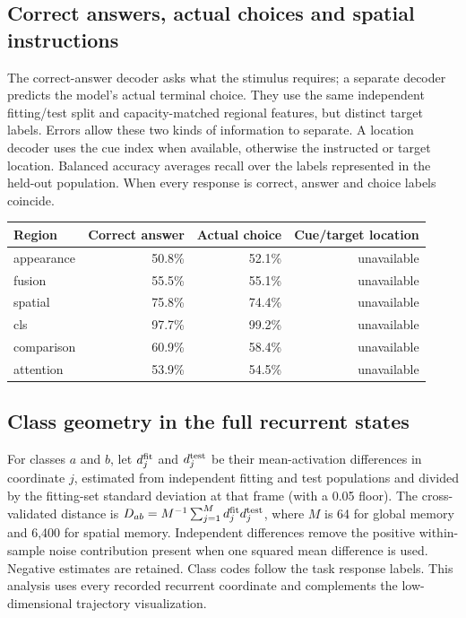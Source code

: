 \documentclass[11pt]{article}
\begin{document}
\subsection{Correct answers, actual choices and spatial instructions}
The correct-answer decoder asks what the stimulus requires; a separate decoder predicts the model's actual terminal choice. They use the same independent fitting/test split and capacity-matched regional features, but distinct target labels. Errors allow these two kinds of information to separate. A location decoder uses the cue index when available, otherwise the instructed or target location. Balanced accuracy averages recall over the labels represented in the held-out population. When every response is correct, answer and choice labels coincide.

\begin{center}\small\begin{tabular}{lrrr}\toprule Region & Correct answer & Actual choice & Cue/target location\\\midrule
appearance & 50.8\% & 52.1\% & unavailable\\
fusion & 55.5\% & 55.1\% & unavailable\\
spatial & 75.8\% & 74.4\% & unavailable\\
cls & 97.7\% & 99.2\% & unavailable\\
comparison & 60.9\% & 58.4\% & unavailable\\
attention & 53.9\% & 54.5\% & unavailable\\
\bottomrule\end{tabular}\normalsize\end{center}
\subsection{Class geometry in the full recurrent states}
For classes $a$ and $b$, let $d^{\rm fit}_j$ and $d^{\rm test}_j$ be their mean-activation differences in coordinate $j$, estimated from independent fitting and test populations and divided by the fitting-set standard deviation at that frame (with a 0.05 floor). The cross-validated distance is $D_{ab}=M^{-1}\sum_{j=1}^{M}d^{\rm fit}_j d^{\rm test}_j$, where $M$ is 64 for global memory and 6,400 for spatial memory. Independent differences remove the positive within-sample noise contribution present when one squared mean difference is used. Negative estimates are retained. Class codes follow the task response labels. This analysis uses every recorded recurrent coordinate and complements the low-dimensional trajectory visualization.
\end{document}
